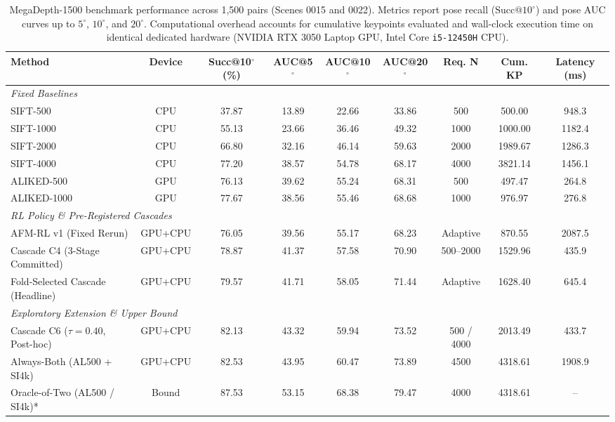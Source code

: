 \documentclass[conference]{IEEEtran}
\begin{document}
\begin{table}[t]
\centering
\caption{MegaDepth-1500 benchmark performance across 1,500 pairs (Scenes 0015 and 0022). Metrics report pose recall ($\text{Succ}@10^\circ$) and pose AUC curves up to $5^\circ$, $10^\circ$, and $20^\circ$. Computational overhead accounts for cumulative keypoints evaluated and wall-clock execution time on identical dedicated hardware (NVIDIA RTX 3050 Laptop GPU, Intel Core \texttt{i5-12450H} CPU).}
\label{tab:megadepth_main}
\small
\begin{tabular}{lcccccccc}
\hline
\textbf{Method} & \textbf{Device} & \textbf{Succ@10$^\circ$ (\%)} & \textbf{AUC@5$^\circ$} & \textbf{AUC@10$^\circ$} & \textbf{AUC@20$^\circ$} & \textbf{Req. N} & \textbf{Cum. KP} & \textbf{Latency (ms)} \\
\hline
\multicolumn{9}{l}{\textit{Fixed Baselines}} \\
SIFT-500 & CPU & 37.87 & 13.89 & 22.66 & 33.86 & 500 & 500.00 & 948.3 \\
SIFT-1000 & CPU & 55.13 & 23.66 & 36.46 & 49.32 & 1000 & 1000.00 & 1182.4 \\
SIFT-2000 & CPU & 66.80 & 32.16 & 46.14 & 59.63 & 2000 & 1989.67 & 1286.3 \\
SIFT-4000 & CPU & 77.20 & 38.57 & 54.78 & 68.17 & 4000 & 3821.14 & 1456.1 \\
ALIKED-500 & GPU & 76.13 & 39.62 & 55.24 & 68.31 & 500 & 497.47 & 264.8 \\
ALIKED-1000 & GPU & 77.67 & 38.56 & 55.46 & 68.68 & 1000 & 976.97 & 276.8 \\
\hline
\multicolumn{9}{l}{\textit{RL Policy \& Pre-Registered Cascades}} \\
AFM-RL v1 (Fixed Rerun) & GPU+CPU & 76.05 & 39.56 & 55.17 & 68.23 & Adaptive & 870.55 & 2087.5 \\
Cascade C4 (3-Stage Committed) & GPU+CPU & 78.87 & 41.37 & 57.58 & 70.90 & 500--2000 & 1529.96 & 435.9 \\
Fold-Selected Cascade (Headline) & GPU+CPU & 79.57 & 41.71 & 58.05 & 71.44 & Adaptive & 1628.40 & 645.4 \\
\hline
\multicolumn{9}{l}{\textit{Exploratory Extension \& Upper Bound}} \\
Cascade C6 ($\tau=0.40$, Post-hoc) & GPU+CPU & 82.13 & 43.32 & 59.94 & 73.52 & 500 / 4000 & 2013.49 & 433.7 \\
Always-Both (AL500 + SI4k) & GPU+CPU & 82.53 & 43.95 & 60.47 & 73.89 & 4500 & 4318.61 & 1908.9 \\
Oracle-of-Two (AL500 / SI4k)* & Bound & 87.53 & 53.15 & 68.38 & 79.47 & 4000 & 4318.61 & -- \\
\hline
\end{tabular}
\end{table}
\end{document}
